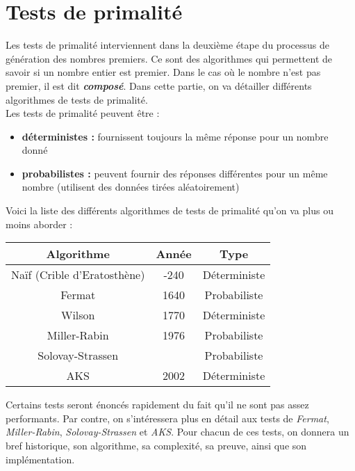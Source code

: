 \section{Tests de primalité}

	Les tests de primalité interviennent dans la deuxième étape du processus de génération des nombres premiers. Ce sont des algorithmes qui permettent de savoir si un nombre entier est premier. Dans le cas où le nombre n'est pas premier, il est dit \textbf{\textit{composé}}. Dans cette partie, on va détailler différents algorithmes de tests de primalité.\\
	Les tests de primalité peuvent être :
	\begin{itemize}[leftmargin=*]
		\item \textbf{déterministes :} fournissent toujours la même réponse pour un nombre donné
		\item \textbf{probabilistes :} peuvent fournir des réponses différentes pour un même nombre (utilisent des données tirées aléatoirement)
	\end{itemize}
	
	Voici la liste des différents algorithmes de tests de primalité qu'on va plus ou moins aborder :
	\begin{table}[H]\begin{center}
		\begin{tabular}{|c|c|c|}
		\hline
		Algorithme           & Année & Type       \\ \hline
		Naïf (Crible d’Eratosthène) & -240  & Déterministe \\ \hline
		Fermat               & 1640  & Probabiliste \\ \hline
		Wilson               & 1770  & Déterministe \\ \hline
		Miller-Rabin         & 1976  & Probabiliste \\ \hline
		Solovay-Strassen     & ~     & Probabiliste \\ \hline
		AKS                  & 2002  & Déterministe \\ \hline
		\end{tabular}
	\end{center}\end{table}
	
	Certains tests seront énoncés rapidement du fait qu'il ne sont pas assez performants. Par contre, on s'intéressera plus en détail aux tests de \textit{Fermat}, \textit{Miller-Rabin}, \textit{Solovay-Strassen} et \textit{AKS}. Pour chacun de ces tests, on donnera un bref historique, son algorithme, sa complexité, sa preuve, ainsi que son implémentation.
	
	
	
	
	
	
	